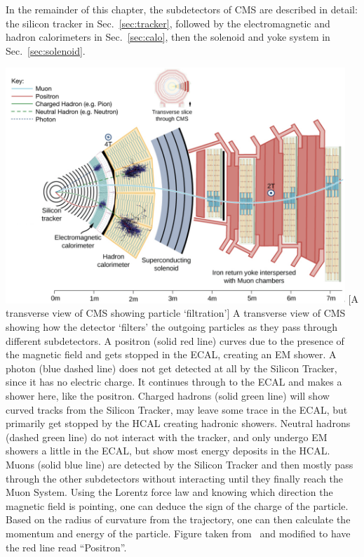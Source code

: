 In the remainder of this chapter, the subdetectors of CMS are described in detail:
the silicon tracker in Sec.~\ref{sec:tracker},
followed by the electromagnetic and hadron calorimeters in Sec.~\ref{sec:calo},
then the solenoid and yoke system in Sec.~\ref{sec:solenoid}.
\begin{multiFigure}
    \centering
    \includegraphics[width=0.96\textwidth,keepaspectratio]{figures/cms/cms_transverse_particletrajectories_corrected.png}
        [A transverse view of CMS showing particle `filtration']
        {A transverse view of CMS showing how the detector `filters' the outgoing particles as they pass through different subdetectors.
        A positron (solid red line) curves due to the presence of the magnetic field and gets stopped in the ECAL, creating an EM shower.
        A photon (blue dashed line) does not get detected at all by the Silicon Tracker, since it has no electric charge.
        It continues through to the ECAL and makes a shower here, like the positron.
        Charged hadrons (solid green line) will show curved tracks from the Silicon Tracker, may leave some trace in the ECAL, but primarily get stopped by the HCAL creating hadronic showers.
        Neutral hadrons (dashed green line) do not interact with the tracker, and only undergo EM showers a little in the ECAL, but show most energy deposits in the HCAL.
        Muons (solid blue line) are detected by the Silicon Tracker and then mostly pass through the other subdetectors without interacting until they finally reach the Muon System.
        Using the Lorentz force law and knowing which direction the magnetic field is pointing, one can deduce the sign of the charge of the particle. 
        Based on the radius of curvature from the trajectory, one can then calculate the momentum and energy of the particle.
        Figure taken from~\cite{cms_filter} and modified to have the red line read ``Positron''.} 
    \label{fig:cms_particle_trajectories}
\end{multiFigure}


